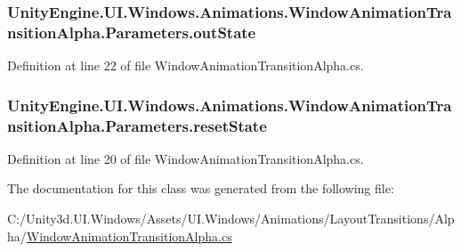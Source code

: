 \subsubsection[{out\+State}]{ Unity\+Engine.\+U\+I.\+Windows.\+Animations.\+Window\+Animation\+Transition\+Alpha.\+Parameters.\+out\+State}\label{class_unity_engine_1_1_u_i_1_1_windows_1_1_animations_1_1_window_animation_transition_alpha_1_1_parameters_abecfa40087289af172d81e96c6997369}


Definition at line 22 of file Window\+Animation\+Transition\+Alpha.\+cs.

\hypertarget{class_unity_engine_1_1_u_i_1_1_windows_1_1_animations_1_1_window_animation_transition_alpha_1_1_parameters_a6ab21ca7f853c85d2a04768af1e9f6d2}{}
\subsubsection[{reset\+State}]{ Unity\+Engine.\+U\+I.\+Windows.\+Animations.\+Window\+Animation\+Transition\+Alpha.\+Parameters.\+reset\+State}\label{class_unity_engine_1_1_u_i_1_1_windows_1_1_animations_1_1_window_animation_transition_alpha_1_1_parameters_a6ab21ca7f853c85d2a04768af1e9f6d2}


Definition at line 20 of file Window\+Animation\+Transition\+Alpha.\+cs.



The documentation for this class was generated from the following file\+:\begin{DoxyCompactItemize}
\item 
C\+:/\+Unity3d.\+U\+I.\+Windows/\+Assets/\+U\+I.\+Windows/\+Animations/\+Layout\+Transitions/\+Alpha/\hyperlink{_window_animation_transition_alpha_8cs}{Window\+Animation\+Transition\+Alpha.\+cs}\end{DoxyCompactItemize}
